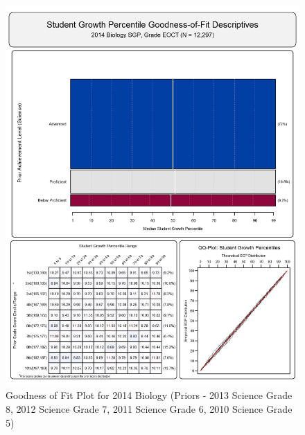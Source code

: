 \documentclass[12pt]{article}
\begin{document}
\begin{figure}[htbp]
\centering
\includegraphics{../img/Goodness_of_Fit/BIOLOGY.2014/2014_BIOLOGY_EOCT;2013_SCIENCE_8;2012_SCIENCE_7;2011_SCIENCE_6;2010_SCIENCE_5.png}
\caption{Goodness of Fit Plot for 2014 Biology (Priors - 2013 Science
Grade 8, 2012 Science Grade 7, 2011 Science Grade 6, 2010 Science Grade
5)}
\end{figure}
\end{document}
